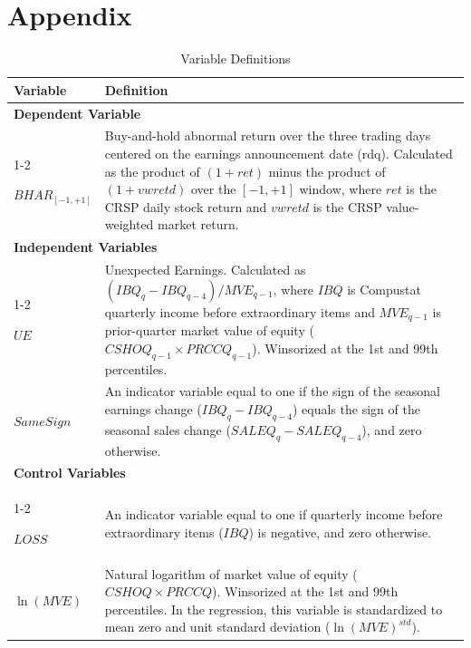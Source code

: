 \documentclass[english,authoryear,IEEEtran,12pt]{article}
\begin{document}
\section*{{\large Appendix}} \label{appendix}

\begin{table}[h!t!b] \footnotesize
{}
\captionsetup{justification=centering}
\caption{Variable Definitions} \label{vars}
\renewcommand{\arraystretch}{1.3}
\begin{tabular}{p{3.8cm}p{12cm}}
\toprule
\multicolumn{1}{l}{Variable} & \multicolumn{1}{l}{Definition} \\
\toprule

\multicolumn{2}{l}{\textbf{Dependent Variable}}\\
\cmidrule{1-2}

$BHAR_{[-1,+1]}$ & Buy-and-hold abnormal return over the three trading days centered on the earnings announcement date (rdq). Calculated as the product of $(1 + ret)$ minus the product of $(1 + vwretd)$ over the $[-1,+1]$ window, where $ret$ is the CRSP daily stock return and $vwretd$ is the CRSP value-weighted market return. \\

\multicolumn{2}{l}{\textbf{Independent Variables}}\\
\cmidrule{1-2}

$UE$ & Unexpected Earnings. Calculated as $(IBQ_{q} - IBQ_{q-4}) / MVE_{q-1}$, where $IBQ$ is Compustat quarterly income before extraordinary items and $MVE_{q-1}$ is prior-quarter market value of equity ($CSHOQ_{q-1} \times PRCCQ_{q-1}$). Winsorized at the 1st and 99th percentiles. \\

$SameSign$ & An indicator variable equal to one if the sign of the seasonal earnings change ($IBQ_{q} - IBQ_{q-4}$) equals the sign of the seasonal sales change ($SALEQ_{q} - SALEQ_{q-4}$), and zero otherwise. \\

\multicolumn{2}{l}{\textbf{Control Variables}}\\
\cmidrule{1-2}

$LOSS$ & An indicator variable equal to one if quarterly income before extraordinary items ($IBQ$) is negative, and zero otherwise. \\

$\ln(MVE)$ & Natural logarithm of market value of equity ($CSHOQ \times PRCCQ$). Winsorized at the 1st and 99th percentiles. In the regression, this variable is standardized to mean zero and unit standard deviation ($\ln(MVE)^{std}$). \\

\bottomrule
\end{tabular}
\end{table}
\end{document}
